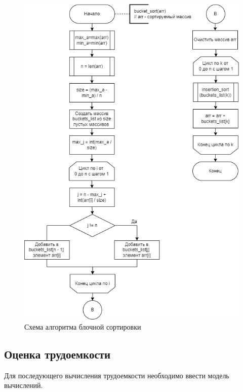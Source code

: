 \begin{figure}[h!btp]
	\centering
	\includegraphics[width=420pt]{inc/sorting-bucket.png}
	\caption{Схема алгоритма блочной сортировки}
	\label{fig:sorting-bucket}	
\end{figure}
\clearpage

\subsection{Оценка трудоемкости}

Для последующего вычисления трудоемкости необходимо ввести модель вычислений.

